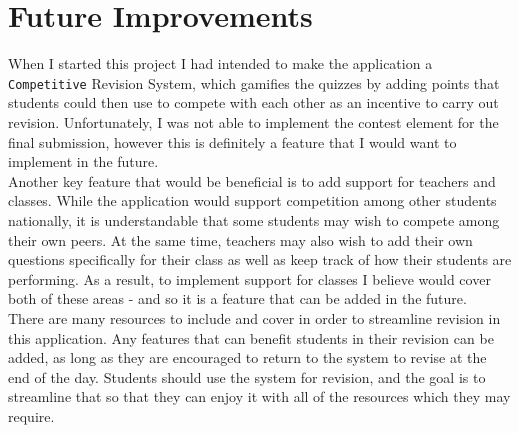 \documentclass[]{final_report}
\begin{document}
\section{Future Improvements}

When I started this project I had intended to make the application a \texttt{Competitive} Revision System, which gamifies the quizzes by adding points that students could then use to compete with each other as an incentive to carry out revision. Unfortunately, I was not able to implement the contest element for the final submission, however this is definitely a feature that I would want to implement in the future.\\

Another key feature that would be beneficial is to add support for teachers and classes. While the application would support competition among other students nationally, it is understandable that some students may wish to compete among their own peers. At the same time, teachers may also wish to add their own questions specifically for their class as well as keep track of how their students are performing. As a result, to implement support for classes I believe would cover both of these areas - and so it is a feature that can be added in the future.\\

There are many resources to include and cover in order to streamline revision in this application. Any features that can benefit students in their revision can be added, as long as they are encouraged to return to the system to revise at the end of the day. Students should use the system for revision, and the goal is to streamline that so that they can enjoy it with all of the resources which they may require.
\end{document}
